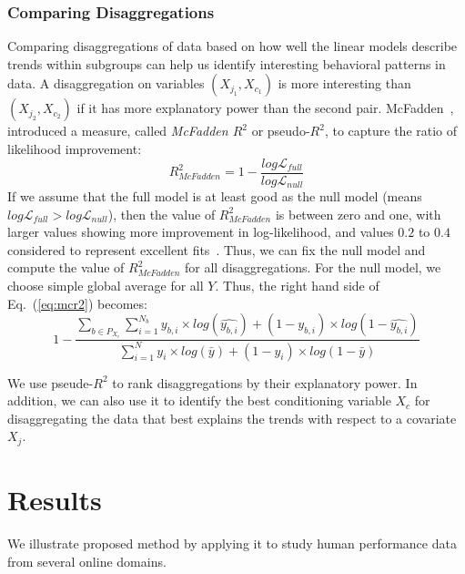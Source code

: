 \documentclass[letterpaper]{article} %
\begin{document}
\subsubsection{Comparing Disaggregations}
Comparing disaggregations of data based on how well the linear models describe trends within subgroups can help us identify interesting behavioral patterns in data. A disaggregation on variables $(X_{j_1}, X_{c_1})$ is more interesting than $(X_{j_2}, X_{c_2})$ if it has more explanatory power than the second pair. McFadden~\cite{mcfadden1}, introduced a measure, called \textit{McFadden $R^2$} or pseudo-$R^2$, to capture the ratio of likelihood improvement: %
\begin{equation}
R^2_{McFadden} = 1 - \frac{log \mathcal{L}_{full}}{log \mathcal{L}_{null}}
\label{eq:mcr2}
\end{equation}
If we assume that the full model is at least good as the null model (means $log \mathcal{L}_{full} > log \mathcal{L}_{null}$), then the value of $R^2_{McFadden}$ is between zero and one, with larger values showing more improvement in log-likelihood, and values $0.2$ to $0.4$ considered to represent excellent fits~\cite{mcfadden2}. Thus, we can fix the null model and compute the value of $R^2_{McFadden}$ for all disaggregations. For the null model, we choose simple global average for all $Y$. Thus, the right hand side of Eq.~(\ref{eq:mcr2}) becomes: %
\begin{equation}
1 - \frac{\sum_{b \in P_{X_c}} \sum_{i = 1}^{N_b} y_{b, i} \times log(\hat{y_{b, i}}) + (1 - y_{b, i}) \times log(1 - \hat{y_{b, i}})}{ \sum_{i = 1}^{N} y_i \times log(\bar{y}) + (1 - y_i) \times log(1 - \bar{y}) }
\end{equation}

We use pseude-$R^2$ to rank disaggregations by their explanatory power.
In addition, we can also use it to identify the best conditioning variable $X_c$ for disaggregating the data that best explains the trends with respect to a covariate $X_j$.


\section{Results}
\label{sec:results}
We illustrate proposed method by applying it to study human performance data from several online domains.
\end{document}
